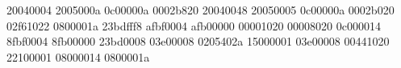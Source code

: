 20040004
2005000a
0c00000a
0002b820
20040048
20050005
0c00000a
0002b020
02f61022
0800001a
23bdfff8
afbf0004
afb00000
00001020
00008020
0c000014
8fbf0004
8fb00000
23bd0008
03e00008
0205402a
15000001
03e00008
00441020
22100001
08000014
0800001a
